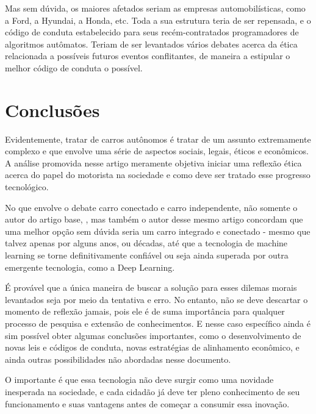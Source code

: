 \documentclass[12pt]{article}
\begin{document}
		Mas sem dúvida, os maiores afetados seriam as empresas automobilísticas, como a Ford, a Hyundai, a Honda, etc. Toda a sua estrutura teria de ser repensada, e o código de conduta estabelecido para seus recém-contratados programadores de algoritmos autômatos. Teriam de ser levantados vários debates acerca da ética relacionada a possíveis futuros eventos conflitantes, de maneira a estipular o melhor código de conduta o possível.
		
	\section{\label{conlusoes}Conclusões}
		
		Evidentemente, tratar de carros autônomos é tratar de um assunto extremamente complexo e que envolve uma série de aspectos sociais, legais, éticos e econômicos. A análise promovida nesse artigo meramente objetiva iniciar uma reflexão ética acerca do papel do motorista na sociedade e como deve ser tratado esse progresso tecnológico.
		
		No que envolve o debate carro conectado e carro independente, não somente o autor do artigo base, \citet{mcbride_ethics_2016}, mas também o autor desse mesmo artigo concordam que uma melhor opção sem dúvida seria um carro integrado e conectado - mesmo que talvez apenas por alguns anos, ou décadas, até que a tecnologia de machine learning se torne definitivamente confiável ou seja ainda superada por outra emergente tecnologia, como a Deep Learning.
		
		É provável que a única maneira de buscar a solução para esses dilemas morais levantados seja por meio da tentativa e erro. No entanto, não se deve descartar o momento de reflexão jamais, pois ele é de suma importância para qualquer processo de pesquisa e extensão de conhecimentos. E nesse caso específico ainda é sim possível obter algumas conclusões importantes, como o desenvolvimento de novas leis e códigos de conduta, novas estratégias de alinhamento econômico, e ainda outras possibilidades não abordadas nesse documento.
		
		O importante é que essa tecnologia não deve surgir como uma novidade inesperada na sociedade, e cada cidadão já deve ter pleno conhecimento de seu funcionamento e suas vantagens antes de começar a consumir essa inovação. 
		
	
	
	
\end{document}
